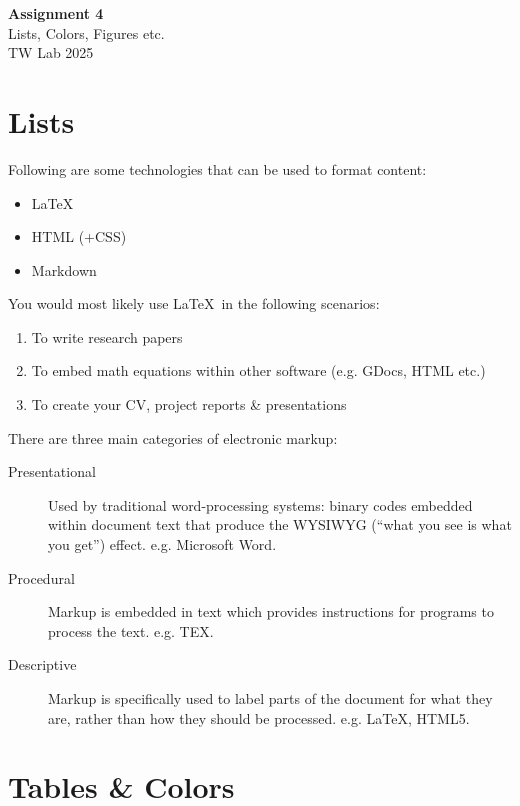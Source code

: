 \documentclass[12pt,a4paper]{article}
\begin{document}
	
	\begin{center}
		{\LARGE \textbf{Assignment 4}}\\[5pt]
		{\large Lists, Colors, Figures etc.}\\[5pt]
		TW Lab 2025
	\end{center}
	
	\section{Lists}
	
	Following are some technologies that can be used to format content:
	
	\begin{itemize}
		\item \LaTeX
		\item HTML (+CSS)
		\item Markdown
	\end{itemize}
	
	You would most likely use \LaTeX\ in the following scenarios:
	
	\begin{enumerate}
		\item To write research papers
		\item To embed math equations within other software (e.g. GDocs, HTML etc.)
		\item To create your CV, project reports \& presentations
	\end{enumerate}
	
	There are three main categories of electronic markup:
	
	\begin{description}
		\item[Presentational] Used by traditional word-processing systems: binary codes embedded within document text that produce the WYSIWYG (``what you see is what you get'') effect. e.g. Microsoft Word.
		
		\item[Procedural] Markup is embedded in text which provides instructions for programs to process the text. e.g. TEX.
		
		\item[Descriptive] Markup is specifically used to label parts of the document for what they are, rather than how they should be processed. e.g. \LaTeX, HTML5.
	\end{description}
	
	\section{Tables \& Colors}
	
\end{document}
